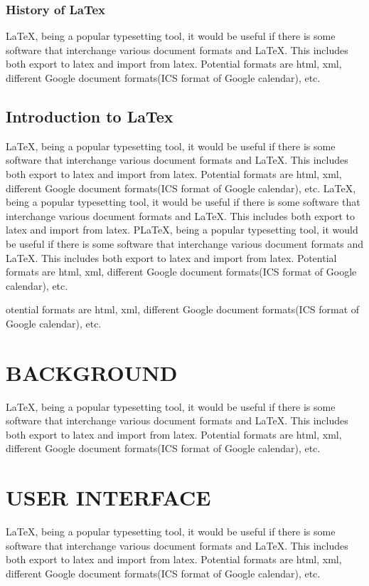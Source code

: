 \documentclass[a4paper,10pt]{mesreport}
\begin{document}
\subsection{History of LaTex}

LaTeX, being a popular typesetting tool, it would be useful if there is some software that interchange
various document formats and LaTeX. This includes both export to latex and import from latex.
Potential formats are html, xml, different Google document formats(ICS format of Google calendar), etc.

\section{Introduction to LaTex}
LaTeX, being a popular typesetting tool, it would be useful if there is some software that interchange
various document formats and LaTeX. This includes both export to latex and import from latex.
Potential formats are html, xml, different Google document formats(ICS format of Google calendar), etc.
LaTeX, being a popular typesetting tool, it would be useful if there is some software that interchange
various document formats and LaTeX. This includes both export to latex and import from latex.
PLaTeX, being a popular typesetting tool, it would be useful if there is some software that interchange
various document formats and LaTeX. This includes both export to latex and import from latex.
Potential formats are html, xml, different Google document formats(ICS format of Google calendar), etc.

otential formats are html, xml, different Google document formats(ICS format of Google calendar), etc.

\chapter{BACKGROUND}
LaTeX, being a popular typesetting tool, it would be useful if there is some software that interchange
various document formats and LaTeX. This includes both export to latex and import from latex.
Potential formats are html, xml, different Google document formats(ICS format of Google calendar), etc.

\chapter{USER INTERFACE}
LaTeX, being a popular typesetting tool, it would be useful if there is some software that interchange
various document formats and LaTeX. This includes both export to latex and import from latex.
Potential formats are html, xml, different Google document formats(ICS format of Google calendar), etc.
\end{document}
